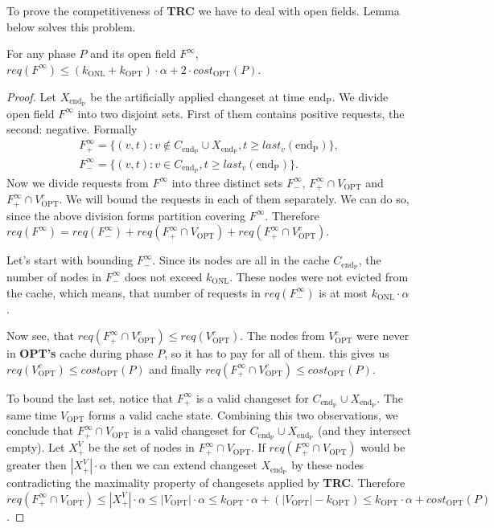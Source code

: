 To prove the competitiveness of \textbf{TRC} we have to deal with open fields. 
Lemma below solves this problem.
\begin{lemma}
For any phase $P$ and its open field $F^{\infty}$, $req(F^{\infty}) \leq 
(k_{\mathrm{ONL}} + k_{\mathrm{OPT}}) \cdot \alpha + 2 \cdot 
cost_{\mathrm{OPT}}(P)$.
\label{thm:inifinite_filed_bound}
\end{lemma}
\begin{proof}
Let $X_{\mathrm{end_P}}$ be the	artificially applied changeset at time 
$\mathrm{end_P}$. We divide open field $F^{\infty}$ into two disjoint sets. 
First of them contains positive requests, the second: negative. Formally
\begin{gather*}
F^{\infty}_{+} = \{(v, t): v \notin C_{\mathrm{end_P}} \cup 
X_{\mathrm{end_P}}, t \geq last_v(\mathrm{end_P})\}, \\
F^{\infty}_{-} = \{(v, t): v \in C_{\mathrm{end_P}}, t \geq 
last_v(\mathrm{end_P})\}. 
\end{gather*}
Now we divide requests from $F^{\infty}$ into three distinct sets 
$F^{\infty}_{-}$, $F^{\infty}_{+} \cap V_{\mathrm{OPT}}$ and $F^{\infty}_{+} 
\cap V_{\mathrm{OPT}}^c$. We will bound the requests in each of them 
separately. We can do so, since the above division forms partition covering  
$F^{\infty}$. Therefore $req(F^{\infty}) = req(F^{\infty}_{-}) + 
req(F^{\infty}_{+} \cap V_{\mathrm{OPT}}) + req(F^{\infty}_{+} \cap 
V_{\mathrm{OPT}}^c)$.

Let's start with bounding $F^{\infty}_{-}$. Since its nodes are all in the 
cache $C_{\mathrm{end_P}}$, the number of nodes in $F^{\infty}_{-}$ does not 
exceed $k_{\mathrm{ONL}}$. These nodes were not evicted from the cache, which 
means, that number of requests in $req(F^{\infty}_{-})$ is at most 
$k_{\mathrm{ONL}} \cdot \alpha$.

Now see, that $req(F^{\infty}_{+} \cap V_{\mathrm{OPT}}^c) \leq 
req(V_{\mathrm{OPT}}^c)$. The nodes from $V_{\mathrm{OPT}}^c$ were never in 
\textbf{OPT's} cache during phase $P$, so it has to pay for all of them. this 
gives us $req(V_{\mathrm{OPT}}^c) \leq cost_{\mathrm{OPT}}(P)$ and finally 
$req(F^{\infty}_{+} \cap V_{\mathrm{OPT}}^c) \leq cost_{\mathrm{OPT}}(P)$.

To bound the last set, notice that $F^{\infty}_{+}$ is a valid changeset for 
$C_{\mathrm{end_P}} \cup X_{\mathrm{end_P}}$. The same time $V_{\mathrm{OPT}}$ 
forms a valid cache state. Combining this two observations, we conclude that 
$F^{\infty}_{+} \cap V_{\mathrm{OPT}}$ is a valid changeset for 
$C_{\mathrm{end_P}} \cup X_{\mathrm{end_P}}$ (and they intersect empty). Let 
$X^{V}_{+}$ be the set of nodes in $F^{\infty}_{+} \cap V_{\mathrm{OPT}}$. If 
$req(F^{\infty}_{+} \cap V_{\mathrm{OPT}})$ would be greater then $|X^{V}_{+}| 
\cdot \alpha$ then we can extend changeset $X_{\mathrm{end_P}}$ by these nodes 
contradicting the maximality property of changesets applied by \textbf{TRC}. 
Therefore $req(F^{\infty}_{+} \cap V_{\mathrm{OPT}}) \leq |X^{V}_{+}| \cdot 
\alpha \leq |V_{\mathrm{OPT}}| \cdot \alpha \leq k_{\mathrm{OPT}} \cdot \alpha 
+ (|V_{\mathrm{OPT}}| - k_{\mathrm{OPT}}) \leq k_{\mathrm{OPT}} \cdot \alpha 
+ cost_{\mathrm{OPT}}(P)$.


\end{proof}
